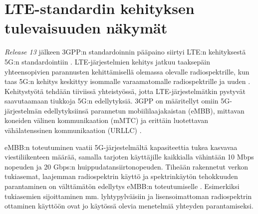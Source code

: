 \documentclass[finnish,12pt,a4paper,pdftex]{article}
\begin{document}

\clearpage
\section{LTE-standardin kehityksen tulevaisuuden näkymät}

\textit{Release 13} jälkeen 3GPP:n standardoinnin pääpaino siirtyi LTE:n kehityksestä 5G:n standardointiin \cite{ericssonRelease14}. LTE-järjestelmien kehitys jatkuu taaksepäin yhteensopivien parannusten kehittämisellä olemassa olevalle radiospektrille, kun taas 5G:n kehitys keskittyy isommalle varaamatomalle radiospektrille ja uuden . Kehitystyötä tehdään tiiviissä yhteistyössä, jotta LTE-järjestelmätkin pystyvät saavutaamaan tiukkoja 5G:n edellytyksiä. 3GPP on määritellyt omiin 5G-järjestelmän edellytyksiinsä parannetun mobiililaajakaistan (eMBB), mittavan koneiden välinen kommunikaation (mMTC) ja erittäin luotettavan vähälatenssinen kommunikaation (URLLC) \cite{hoymann2016lte}.


eMBB:n toteutuminen vaatii 5G-järjestelmältä kapasiteettia tukea kasvavaa viestiliikenteen määrää, samalla tarjoten käyttäjille kaikkialla vähintään 10 Mbps nopeuden ja 20 Gbps:n huippudatansiirtonopeuden. Tiheään rakennetut verkon tukiasemat, laajemman radiospektrin käyttö ja spektrinkäytön tehokkuuden parantaminen on välttämätön edellytys eMBB:n toteutumiselle \cite{hoymann2016lte}. Esimerkiksi tukiasemien sijoittaminen mm. lyhtypylväisiin ja lisensoimattoman radiospektrin ottaminen käyttöön ovat jo käytössä olevia menetelmiä yhteyden parantamiseksi.
\end{document}
